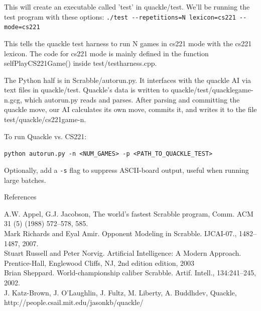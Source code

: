 \documentclass[12pt]{article}
\begin{document}
This will create an executable called 'test' in quackle/test. We'll be
running the test program with these options:
\verb|./test --repetitions=N lexicon=cs221 --mode=cs221|

This tells the quackle test harness to run N games in cs221 mode with
the cs221 lexicon. The code for cs221 mode is mainly defined in the
function selfPlayCS221Game() inside test/testharness.cpp.

The Python half is in Scrabble/autorun.py. It interfaces with the
quackle AI via text files in quackle/test. Quackle's data is written
to quackle/test/quacklegame-n.gcg, which autorun.py reads and
parses. After parsing and committing the quackle move, our AI
calculates its own move, commits it, and writes it to the file
test/quackle/cs221game-n.

To run Quackle vs. CS221:

\verb|python autorun.py -n <NUM_GAMES> -p <PATH_TO_QUACKLE_TEST>|

Optionally, add a \texttt{-s} flag to suppress ASCII-board output,
useful when running large batches.

\vspace{ 8cm }
\clearpage
\begin{center}
{\Large References}
\end{center} 
A.W. Appel, G.J. Jacobson, The world’s fastest Scrabble program, Comm. ACM 31 (5) (1988) 572–578, 585. \\
Mark Richards and Eyal Amir. Opponent Modeling in Scrabble. IJCAI-07., 1482–1487, 2007. \\
Stuart Russell and Peter Norvig. Artificial Intelligence: A Modern Approach. Prentice-Hall,
Englewood Cliffs, NJ, 2nd edition edition, 2003 \\
Brian Sheppard. World-championship caliber Scrabble. Artif. Intell., 134:241–245, 2002. \\
J. Katz-Brown, J. O'Laughlin, J. Fultz, M. Liberty, A. Buddhdev, Quackle,\\ http://people.csail.mit.edu/jasonkb/quackle/
\end{document}
